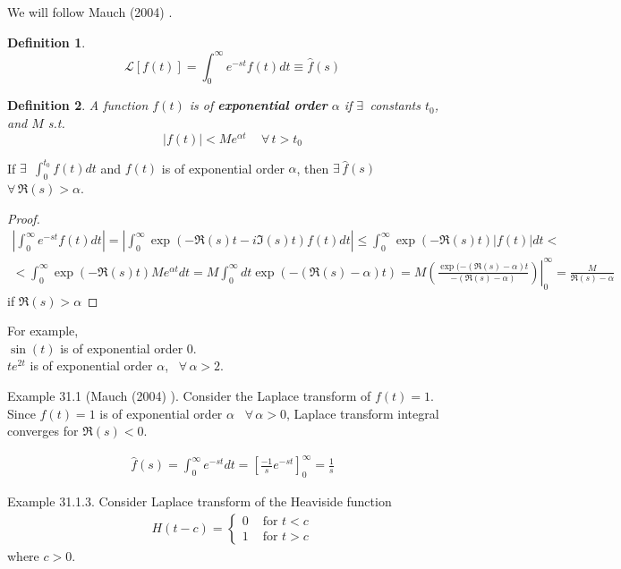 \documentclass[10pt]{amsart}
\newtheorem{definition}{Definition}
\begin{document}
\begin{multicols*}{2}
We will follow Mauch (2004) \cite{Mauc2004}.

\begin{definition}
\begin{equation}
\mathcal{L}[f(t)] = \int_0^{\infty} e^{-st} f(t) dt \equiv \widehat{f}(s)
\end{equation}
\end{definition}

\begin{definition}
A function $f(t)$ is of \textbf{exponential order} $\alpha$ if $\exists \, $ constants $t_0$, and $M$ s.t.
\begin{equation}
|f(t) | < M e^{\alpha t} \quad \, \forall \, t > t_0
\end{equation}
\end{definition}

If $\exists \, $ $\int_0^{t_0} f(t) dt$ and $f(t)$ is of exponential order $\alpha$, then $\exists \, \widehat{f}(s)$ \, $\forall \, \Re{(s)} > \alpha$.

\begin{proof}
\[
\begin{gathered}
| \int_0^{\infty} e^{-st} f(t) dt | = | \int_0^{\infty} \exp{ (-\Re{(s)} t - i \Im{ (s)} t )} f(t) dt | \leq \int_0^{\infty} \exp{( -\Re{(s)} t)} |f(t)| dt < \\
< \int_0^{\infty} \exp{ (- \Re{(s)} t) } Me^{\alpha t} dt   = M \int_0^{\infty} dt \exp{ (- (\Re{ (s)} - \alpha ) t ) } = M \left. \left( \frac{ \exp{ (- (\Re{ (s)} - \alpha ) t} }{ - (\Re{ (s)} - \alpha ) } \right) \right|_0^{\infty} = \frac{M }{ \Re{ (s) } - \alpha }
\end{gathered}
\]
if $\Re{(s)} > \alpha$
\end{proof}

For example, \\
$\sin{(t)}$ is of exponential order 0. \\
$te^{2t}$ is of exponential order $\alpha$, \, $\forall \, \alpha >2$.

Example 31.1 (Mauch (2004) \cite{Mauc2004}). Consider the Laplace transform of $f(t) = 1$.  Since $f(t)= 1$ is of exponential order $\alpha $ \, $\forall \, \alpha >0$, Laplace transform integral converges for $\Re{(s)} < 0$.

\[
\begin{gathered}
\widehat{f}(s) = \int_0^{\infty} e^{-st} dt = \left[ \frac{-1}{s} e^{-st} \right]_0^{\infty} = \frac{1}{s}
\end{gathered}
\]

Example 31.1.3. Consider Laplace transform of the Heaviside function
\[
\begin{gathered}
H(t-c) = \begin{cases}
0 & \text{ for } t < c \\
1 & \text{ for } t > c
\end{cases}
\end{gathered}
\]
where $c>0$.


\end{multicols*}
\end{document}
